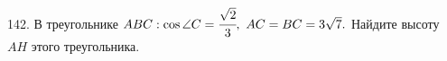 142. В треугольнике $ABC: \cos \angle C=\cfrac{\sqrt{2}}{3},\ AC=BC=3\sqrt{7}.$ Найдите высоту $AH$ этого треугольника.\\
